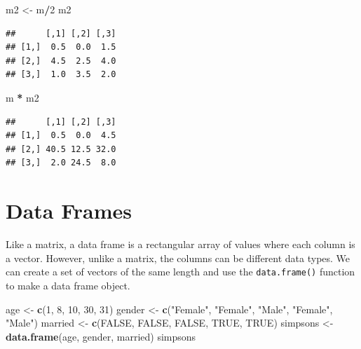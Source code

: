 \documentclass[
]{book}
\newenvironment{Shaded}{\begin{snugshade}}{\end{snugshade}}
\newcommand{\DecValTok}[1]{\textcolor[rgb]{0.00,0.00,0.81}{#1}}
\newcommand{\KeywordTok}[1]{\textcolor[rgb]{0.13,0.29,0.53}{\textbf{#1}}}
\newcommand{\NormalTok}[1]{#1}
\newcommand{\OperatorTok}[1]{\textcolor[rgb]{0.81,0.36,0.00}{\textbf{#1}}}
\newcommand{\OtherTok}[1]{\textcolor[rgb]{0.56,0.35,0.01}{#1}}
\newcommand{\StringTok}[1]{\textcolor[rgb]{0.31,0.60,0.02}{#1}}
\begin{document}
\begin{Shaded}
\begin{Highlighting}[]
\NormalTok{m2 <-}\StringTok{ }\NormalTok{m}\OperatorTok{/}\DecValTok{2}
\NormalTok{m2}
\end{Highlighting}
\end{Shaded}

\begin{verbatim}
##      [,1] [,2] [,3]
## [1,]  0.5  0.0  1.5
## [2,]  4.5  2.5  4.0
## [3,]  1.0  3.5  2.0
\end{verbatim}

\begin{Shaded}
\begin{Highlighting}[]
\NormalTok{m }\OperatorTok{*}\StringTok{ }\NormalTok{m2}
\end{Highlighting}
\end{Shaded}

\begin{verbatim}
##      [,1] [,2] [,3]
## [1,]  0.5  0.0  4.5
## [2,] 40.5 12.5 32.0
## [3,]  2.0 24.5  8.0
\end{verbatim}

\hypertarget{data-frames}{%
\section{Data Frames}\label{data-frames}}

Like a matrix, a data frame is a rectangular array of values where each column is a vector. However, unlike a matrix, the columns can be different data types. We can create a set of vectors of the same length and use the \texttt{data.frame()} function to make a data frame object.

\begin{Shaded}
\begin{Highlighting}[]
\NormalTok{age <-}\StringTok{ }\KeywordTok{c}\NormalTok{(}\DecValTok{1}\NormalTok{, }\DecValTok{8}\NormalTok{, }\DecValTok{10}\NormalTok{, }\DecValTok{30}\NormalTok{, }\DecValTok{31}\NormalTok{)}
\NormalTok{gender <-}\StringTok{ }\KeywordTok{c}\NormalTok{(}\StringTok{"Female"}\NormalTok{, }\StringTok{"Female"}\NormalTok{, }\StringTok{"Male"}\NormalTok{, }\StringTok{"Female"}\NormalTok{, }\StringTok{"Male"}\NormalTok{)}
\NormalTok{married <-}\StringTok{ }\KeywordTok{c}\NormalTok{(}\OtherTok{FALSE}\NormalTok{, }\OtherTok{FALSE}\NormalTok{, }\OtherTok{FALSE}\NormalTok{, }\OtherTok{TRUE}\NormalTok{, }\OtherTok{TRUE}\NormalTok{)}
\NormalTok{simpsons <-}\StringTok{ }\KeywordTok{data.frame}\NormalTok{(age, gender, married)}
\NormalTok{simpsons}
\end{Highlighting}
\end{Shaded}
\end{document}
